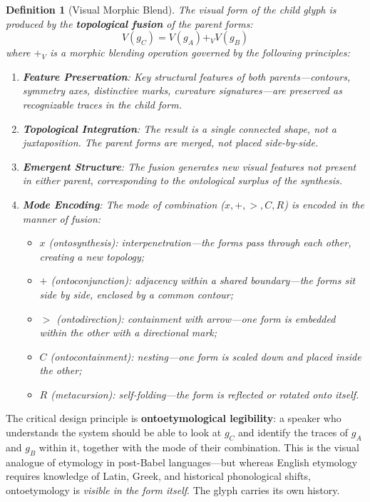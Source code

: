 \documentclass[12pt, letterpaper]{book}
\def\equiv{=}%
\def\otimes{x}%
\def\oplus{+}%
\def\triangleright{>}%
\def\subset{C}%
\def\circlearrowleft{R}%
\def\mathfrak#1{#1}%
\newtheorem{definition}{Definition}[chapter]
\begin{document}
\begin{definition}[Visual Morphic Blend]\label{def:visual-blend}
The visual form of the child glyph is produced by the \textbf{topological fusion} of the parent forms:
\[
V(\mathfrak{g}_C) \equiv V(\mathfrak{g}_A) \oplus_V V(\mathfrak{g}_B)
\]
where $\oplus_V$ is a morphic blending operation governed by the following principles:

\begin{enumerate}[label=(\roman*)]
    \item \textbf{Feature Preservation}: Key structural features of both parents---contours, symmetry axes, distinctive marks, curvature signatures---are preserved as recognizable traces in the child form.
    \item \textbf{Topological Integration}: The result is a single connected shape, not a juxtaposition. The parent forms are \textit{merged}, not placed side-by-side.
    \item \textbf{Emergent Structure}: The fusion generates new visual features not present in either parent, corresponding to the ontological surplus of the synthesis.
    \item \textbf{Mode Encoding}: The mode of combination ($\otimes, \oplus, \triangleright, \subset, \circlearrowleft$) is encoded in the \textit{manner} of fusion:
    \begin{itemize}
        \item $\otimes$ (ontosynthesis): interpenetration---the forms pass through each other, creating a new topology;
        \item $\oplus$ (ontoconjunction): adjacency within a shared boundary---the forms sit side by side, enclosed by a common contour;
        \item $\triangleright$ (ontodirection): containment with arrow---one form is embedded within the other with a directional mark;
        \item $\subset$ (ontocontainment): nesting---one form is scaled down and placed inside the other;
        \item $\circlearrowleft$ (metacursion): self-folding---the form is reflected or rotated onto itself.
    \end{itemize}
\end{enumerate}
\end{definition}

The critical design principle is \textbf{ontoetymological legibility}: a speaker who understands the system should be able to look at $\mathfrak{g}_C$ and identify the traces of $\mathfrak{g}_A$ and $\mathfrak{g}_B$ within it, together with the mode of their combination. This is the visual analogue of etymology in post-Babel languages---but whereas English etymology requires knowledge of Latin, Greek, and historical phonological shifts, ontoetymology is \textit{visible in the form itself}. The glyph carries its own history.
\end{document}
